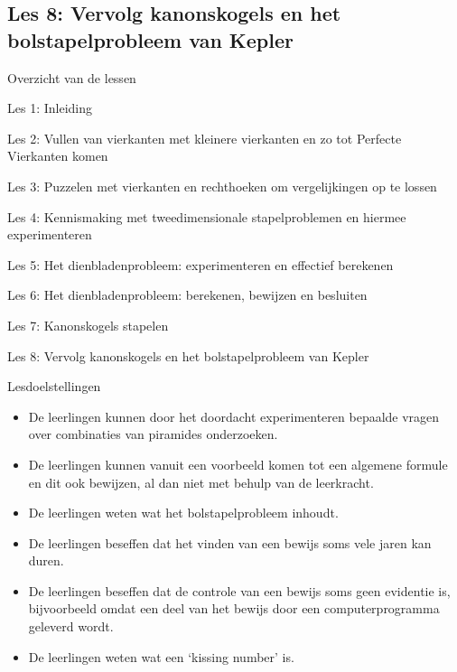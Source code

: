 \documentclass[dutch]{beamer}
\begin{document}
\subsection{Les 8: Vervolg kanonskogels en het bolstapelprobleem van Kepler}
\begin{frame}
{Overzicht van de lessen}
\begin{list}{\quad}{}
\item Les 1: Inleiding
\item Les 2: Vullen van vierkanten met kleinere vierkanten en zo tot Perfecte Vierkanten komen
\item Les 3: Puzzelen met vierkanten en rechthoeken om vergelijkingen op te lossen
\item Les 4: Kennismaking met tweedimensionale stapelproblemen en hiermee experimenteren
\item Les 5: Het dienbladenprobleem: experimenteren en effectief berekenen
\item Les 6: Het dienbladenprobleem: berekenen, bewijzen en besluiten
\item Les 7: Kanonskogels stapelen
\item {\color{blue}Les 8: Vervolg kanonskogels en het bolstapelprobleem van Kepler}
\end{list}
\end{frame}

\begin{frame}{Lesdoelstellingen}
\begin{itemize}
\item De leerlingen kunnen door het doordacht experimenteren bepaalde vragen over combinaties van piramides onderzoeken.
\item De leerlingen kunnen vanuit een voorbeeld komen tot een algemene formule en dit ook bewijzen, al dan niet met behulp van de leerkracht.
\item De leerlingen weten wat het bolstapelprobleem inhoudt.
\item De leerlingen beseffen dat het vinden van een bewijs soms vele jaren kan duren.
\item De leerlingen beseffen dat de controle van een bewijs soms geen evidentie is, bijvoorbeeld omdat een deel van het bewijs door een computerprogramma geleverd wordt.
\item De leerlingen weten wat een `kissing number' is.
\end{itemize}
\end{frame}



\end{document}

